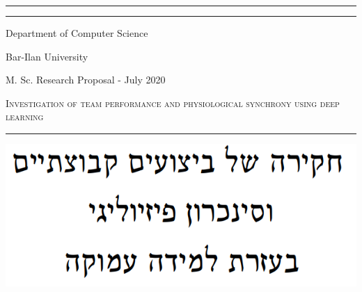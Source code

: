 \documentclass[a4paper, 11pt]{report}      %
\begin{document}
\begin{titlepage} %
	
	\centering %
	\rule{\textwidth}{1pt} %
	
	\vspace{2pt}\vspace{-\baselineskip} 
	
	\rule{\textwidth}{0.4pt} %
		\vspace{0.05\textheight} %
	
	\huge{Department of Computer Science
	
	Bar-Ilan University
	
	\vspace{30pt}}
	\Large{
	M. Sc. Research Proposal - July 2020
	}
	\vspace{15pt}
	
	
{\renewcommand{\baselinestretch}{1.8}\selectfont
    {\Huge \textsc{Investigation of team performance 
and physiological synchrony
using deep learning}} %
\par}

	
	\vspace{0.025\textheight} %
	
	\rule{0.3\textwidth}{0.4pt} %
	\includegraphics[scale=0.5]{hebrew_title.png}
	

\end{titlepage}
\end{document}
